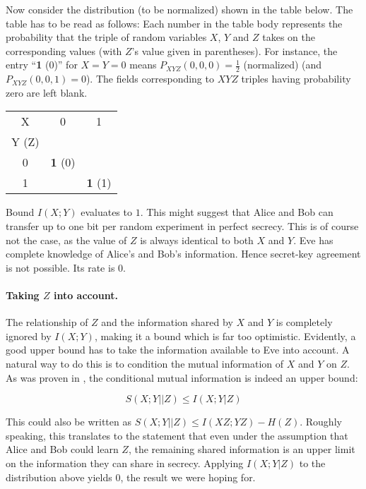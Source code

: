 \documentclass[a4paper, twoside, openany]{report}
\newcommand{\srate}{S(X;Y||Z)}
\newcommand{\p}[1]{\textbf{#1}}
\newcommand{\half}{\frac{1}{2}}
\theoremstyle{plain}
\theoremstyle{definition}
\begin{document}
Now consider the distribution (to be normalized) shown in the table below. The table has to be read as follows: Each number in the table body represents the probability that the triple of random variables $X$, $Y$ and $Z$ takes on the corresponding values (with $Z$'s value given in parentheses). For instance, the entry ``\p{1} (0)'' for $X = Y = 0$ means $P_{XYZ}(0, 0, 0) = \half$ (normalized) (and $P_{XYZ}(0, 0, 1) = 0$). The fields corresponding to $XYZ$ triples having probability zero are left blank.

\begin{center}
\begin{tabular}{|c||c|c|}
\hline
X     &     0     &     1     \\
Y (Z) &           &           \\
\hline\hline
0     & \p{1} (0) &           \\
\hline
1     &           & \p{1} (1) \\
\hline
\end{tabular}
\end{center}


Bound $I(X;Y)$ evaluates to $1$. This might suggest that Alice and Bob can transfer up to one bit per random experiment in perfect secrecy. This is of course not the case, as the value of $Z$ is always identical to both $X$ and $Y$. Eve has complete knowledge of Alice's and Bob's information. Hence secret-key agreement is not possible. Its rate is $0$.

\paragraph{Taking $Z$ into account.} The relationship of $Z$ and the information shared by $X$ and $Y$ is completely ignored by $I(X;Y)$, making it a bound which is far too optimistic. Evidently, a good upper bound has to take the information available to Eve into account. A natural way to do this is to condition the mutual information of $X$ and $Y$ on $Z$. As was proven in \cite{ka}, the conditional mutual information is indeed an upper bound:

\begin{equation} \label{ubnd:condinfoXYwrtZ}
\srate \leq I(X;Y|Z)
\end{equation}

This could also be written as $\srate \leq I(XZ;YZ) - H(Z)$. Roughly speaking, this translates to the statement that even under the assumption that Alice and Bob could learn $Z$, the remaining shared information is an upper limit on the information they can share in secrecy. Applying $I(X;Y|Z)$ to the distribution above yields 0, the result we were hoping for.
\end{document}
